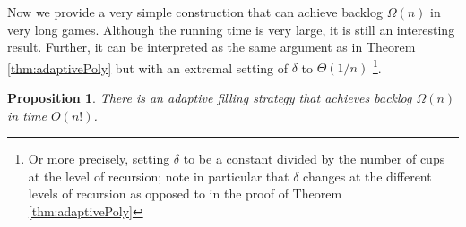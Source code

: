 \documentclass[twocolumn]{article}[10pt]
\newtheorem{proposition}{Proposition}
\begin{document}
Now we provide a very simple construction that can achieve backlog $\Omega(n)$
in very long games. Although the running time is very large, it is
still an interesting result. Further, it can be interpreted as the same
argument as in Theorem \ref{thm:adaptivePoly} but with an extremal setting of
$\delta$ to $\Theta(1/n)$ \footnote{Or more precisely, setting $\delta$ to
be a constant divided by the number of cups at the level of
recursion; note in particular that $\delta$ changes at the
different levels of recursion as opposed to in the proof of
Theorem \ref{thm:adaptivePoly}}.

\begin{proposition}
  \label{prop:factorialTimeAlg}
  There is an adaptive filling strategy that
  achieves backlog $\Omega(n)$ in time $O(n!)$.
\end{proposition}
\end{document}
